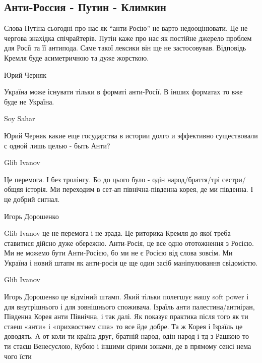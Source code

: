  
 
 
 
 

\subsection{Анти-Россия - Путин - Климкин}
\label{sec:14_05_2021.fb.klimkin_pavel.1.ukraina_antirossia}

Слова Путіна сьогодні про нас як \enquote{анти-Росію} не варто недооцінювати.
Це не чергова знахідка спічрайтерів. Путін каже про нас як постійне джерело
проблем для Росії та її антипода. Саме такої лексики він ще не застосовував.
Відповідь Кремля буде асиметричною та дуже жорсткою.

Юрий Черняк

Україна може існувати тільки в форматі анти-Росії. В інших форматах то вже буде не Україна.

Soy Sahar

Юрий Черняк какие еще государства в истории долго и эффективно существовали с одной лишь целью - быть Анти?

Glib Ivanov

Це перемога. І без тролінгу. Бо до цього було - одін народ/браття/трі
сестри/общяя історія. Ми переходим в сет-ап північна-південна корея, де ми
південна. І це добрий сигнал.

Игорь Дорошенко

Glib Ivanov це не перемога і не зрада. Це риторика Кремля до якої треба
ставитися дійсно дуже обережно. Анти-Росія, це все одно ототожнення з Росією.
Ми не можемо бути Анти-Росією, бо ми не є Росією від слова зовсім. Ми Україна і
новий штапм як анти-росія це ще один засіб маніпулювання свідомістю.

Glib Ivanov

Игорь Дорошенко це відміний штамп. Який тільки полегшує нашу soft power і для внутрішнього і для зовнішнього споживача. Ізраїль анти палестина/антиіран, Південна Корея анти Північна, і так далі. Як показує практика після того як ти стаеш «анти» і «прихвостнем сша» то все йде добре. Та ж Корея і Ізраїль це доводять. А от коли ти країна друг, братній народ, одін народ і тд з Рашкою то ти стаєш Венесуєлою, Кубою і іншими сірими зонами, де в прямому сенсі нема чого їсти

